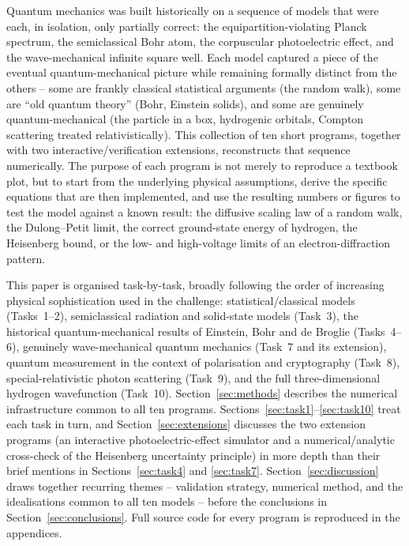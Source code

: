 \documentclass[11pt]{article}
\begin{document}
Quantum mechanics was built historically on a sequence of models that were each, in isolation, only partially correct: the equipartition-violating Planck spectrum, the semiclassical Bohr atom, the corpuscular photoelectric effect, and the wave-mechanical infinite square well. Each model captured a piece of the eventual quantum-mechanical picture while remaining formally distinct from the others -- some are frankly classical statistical arguments (the random walk), some are ``old quantum theory'' (Bohr, Einstein solids), and some are genuinely quantum-mechanical (the particle in a box, hydrogenic orbitals, Compton scattering treated relativistically). This collection of ten short programs, together with two interactive/verification extensions, reconstructs that sequence numerically. The purpose of each program is not merely to reproduce a textbook plot, but to start from the underlying physical assumptions, derive the specific equations that are then implemented, and use the resulting numbers or figures to test the model against a known result: the diffusive scaling law of a random walk, the Dulong--Petit limit, the correct ground-state energy of hydrogen, the Heisenberg bound, or the low- and high-voltage limits of an electron-diffraction pattern.

This paper is organised task-by-task, broadly following the order of increasing physical sophistication used in the challenge: statistical/classical models (Tasks~1--2), semiclassical radiation and solid-state models (Task~3), the historical quantum-mechanical results of Einstein, Bohr and de Broglie (Tasks~4--6), genuinely wave-mechanical quantum mechanics (Task~7 and its extension), quantum measurement in the context of polarisation and cryptography (Task~8), special-relativistic photon scattering (Task~9), and the full three-dimensional hydrogen wavefunction (Task~10). Section~\ref{sec:methods} describes the numerical infrastructure common to all ten programs. Sections~\ref{sec:task1}--\ref{sec:task10} treat each task in turn, and Section~\ref{sec:extensions} discusses the two extension programs (an interactive photoelectric-effect simulator and a numerical/analytic cross-check of the Heisenberg uncertainty principle) in more depth than their brief mentions in Sections~\ref{sec:task4} and \ref{sec:task7}. Section~\ref{sec:discussion} draws together recurring themes -- validation strategy, numerical method, and the idealisations common to all ten models -- before the conclusions in Section~\ref{sec:conclusions}. Full source code for every program is reproduced in the appendices.
\end{document}
